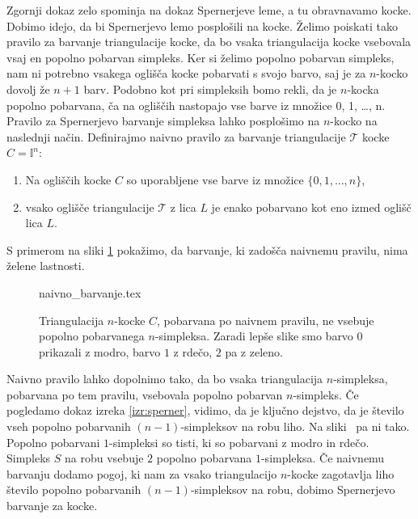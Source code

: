 \documentclass[mat1]{fmfdelo}
\newcommand{\I}{\mathbb I}
\newcommand{\0}{0}
\newcommand{\pT}{\mathcal T}
\begin{document}
Zgornji dokaz zelo spominja na dokaz Spernerjeve leme, a tu obravnavamo kocke. Dobimo idejo, da bi Spernerjevo lemo posplošili na kocke. Želimo poiskati tako pravilo za barvanje triangulacije kocke, da bo vsaka triangulacija kocke vsebovala vsaj en popolno pobarvan simpleks. Ker si želimo popolno pobarvan simpleks, nam ni potrebno vsakega oglišča kocke pobarvati s svojo barvo, saj je za $n$-kocko dovolj že $n+1$ barv. Podobno kot pri simpleksih bomo rekli, da je $n$-kocka popolno pobarvana, ča na ogliščih nastopajo vse barve iz množice {0, 1, \dots, n}.  Pravilo za Spernerjevo barvanje simpleksa lahko posplošimo na $n$-kocko na naslednji način.
Definirajmo naivno pravilo za barvanje triangulacije $\pT$ kocke $C=\I^n$:
\begin{enumerate}
\item Na ogliščih kocke $C$ so uporabljene vse barve iz množice $\{0, 1, \dots, n \}$,
\item vsako oglišče triangulacije $\pT$ z lica $L$ je enako pobarvano kot eno izmed oglišč lica $L$.
\end{enumerate}
S primerom na sliki \ref{fig:ni-pop} pokažimo, da barvanje, ki zadošča naivnemu pravilu, nima želene lastnosti.
\begin{figure}[h!]
	\centering
	{naivno_barvanje.tex}
	\caption{Triangulacija $n$-kocke $C$, pobarvana po naivnem pravilu, ne vsebuje popolno pobarvanega $n$-simpleksa. Zaradi lepše slike smo barvo $0$ prikazali z modro, barvo $1$ z rdečo, $2$ pa z zeleno.}\label{fig:ni-pop}
\end{figure}
Naivno pravilo lahko dopolnimo tako, da bo vsaka triangulacija $n$-simpleksa, pobarvana po tem pravilu, vsebovala popolno pobarvan $n$-simpleks. Če pogledamo dokaz izreka \ref{izr:sperner}, vidimo, da je ključno dejstvo, da je število vseh popolno pobarvanih 
$(n-1)$-simpleksov na robu liho. Na sliki~\label{fig:ni-pop} pa ni tako. Popolno pobarvani $1$-simpleksi so tisti, ki so pobarvani z modro in rdečo. Simpleks $S$ na robu vsebuje $2$ popolno pobarvana $1$-simpleksa. Če naivnemu barvanju dodamo pogoj, ki nam za vsako triangulacijo $n$-kocke zagotavlja liho število popolno pobarvanih $(n-1)$-simpleksov na robu, dobimo Spernerjevo barvanje za kocke.
\end{document}
